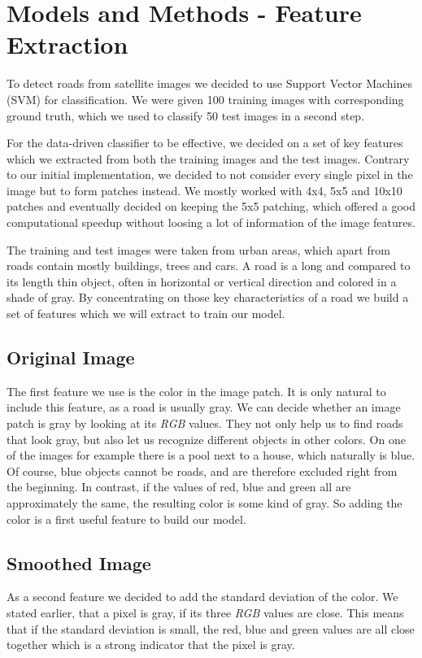 \documentclass[10pt,conference,compsocconf]{IEEEtran}
\begin{document}
\section{Models and Methods - Feature Extraction}
To detect roads from satellite images we decided to use Support Vector Machines (SVM) for classification. We were given 100 training images with corresponding ground truth, which we used to classify 50 test images in a second step.

For the data-driven classifier to be effective, we decided on a set of key features which we extracted from both the training images and the test images. Contrary to our initial implementation, we decided to not consider every single pixel in the image but to form patches instead. We mostly worked with 4x4, 5x5 and 10x10 patches and eventually decided on keeping the 5x5 patching, which offered a good computational speedup without loosing a lot of information of the image features.

The training and test images were taken from urban areas, which apart from roads contain mostly buildings, trees and cars. A road is a long and compared to its length thin object, often in horizontal or vertical direction and colored in a shade of gray. By concentrating on those key characteristics of a road we build a set of features which we will extract to train our model.

\subsection{Original Image}
The first feature we use is the color in the image patch. It is only natural to include this feature, as a road is usually gray. We can decide whether an image patch is gray by looking at its \emph{RGB} values. They not only help us to find roads that look gray, but also let us recognize different objects in other colors. On one of the images for example there is a pool next to a house, which naturally is blue. Of course, blue objects cannot be roads, and are therefore excluded right from the beginning. In contrast, if the values of red, blue and green all are approximately the same, the resulting color is some kind of gray. So adding the color is a first useful feature to build our model. 

\subsection{Smoothed Image}

As a second feature we decided to add the standard deviation of the color. We stated earlier, that a pixel is gray, if its three \emph{RGB} values are close. This means that if the standard deviation is small, the red, blue and green values are all close together which is a strong indicator that the pixel is gray.
\end{document}
